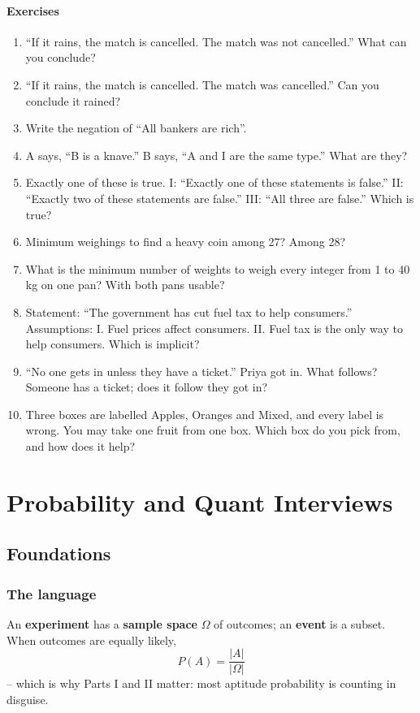 \documentclass[11pt,a4paper,openany]{report}
\newenvironment{exercises}{\subsection*{Exercises \thechapter}\begin{enumerate}[label=\textbf{\thechapter.\arabic*},leftmargin=3.2em]}{\end{enumerate}}
\begin{document}
\begin{exercises}
\item ``If it rains, the match is cancelled. The match was not cancelled.'' What can you conclude?
\item ``If it rains, the match is cancelled. The match was cancelled.'' Can you conclude it rained?
\item Write the negation of ``All bankers are rich''.
\item A says, ``B is a knave.'' B says, ``A and I are the same type.'' What are they?
\item Exactly one of these is true. I: ``Exactly one of these statements is false.'' II: ``Exactly two of these statements are false.'' III: ``All three are false.'' Which is true?
\item Minimum weighings to find a heavy coin among 27? Among 28?
\item What is the minimum number of weights to weigh every integer from 1 to 40 kg on one pan? With both pans usable?
\item Statement: ``The government has cut fuel tax to help consumers.'' Assumptions: I. Fuel prices affect consumers. II. Fuel tax is the only way to help consumers. Which is implicit?
\item ``No one gets in unless they have a ticket.'' Priya got in. What follows? Someone has a ticket; does it follow they got in?
\item Three boxes are labelled Apples, Oranges and Mixed, and every label is wrong. You may take one fruit from one box. Which box do you pick from, and how does it help?
\end{exercises}

\part{Probability and Quant Interviews}
\chapter{Foundations}\label{ch:found}

\section{The language}
An \textbf{experiment} has a \textbf{sample space} $\Omega$ of outcomes; an \textbf{event} is a subset. When outcomes are equally likely,
\[P(A)=\frac{|A|}{|\Omega|}\]
-- which is why Parts I and II matter: most aptitude probability is counting in disguise.
\end{document}
